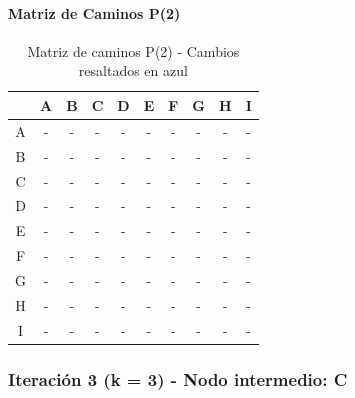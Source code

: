 \documentclass[12pt]{article}
\begin{document}
\paragraph{Matriz de Caminos P(2)}
\begin{table}[h!]
\centering
\begin{tabular}{|c|c|c|c|c|c|c|c|c|c|}
\hline
 & A & B & C & D & E & F & G & H & I \\\hline
A & - & - & - & - & - & - & - & - & - \\\hline
B & - & - & - & - & - & - & - & - & - \\\hline
C & - & - & - & - & - & - & - & - & - \\\hline
D & - & - & - & - & - & - & - & - & - \\\hline
E & - & - & - & - & - & - & - & - & - \\\hline
F & - & - & - & - & - & - & - & - & - \\\hline
G & - & - & - & - & - & - & - & - & - \\\hline
H & - & - & - & - & - & - & - & - & - \\\hline
I & - & - & - & - & - & - & - & - & - \\\hline
\end{tabular}
\caption{Matriz de caminos P(2) - Cambios resaltados en azul}
\end{table}

\subsubsection{Iteración 3 (k = 3) - Nodo intermedio: C}
\end{document}
